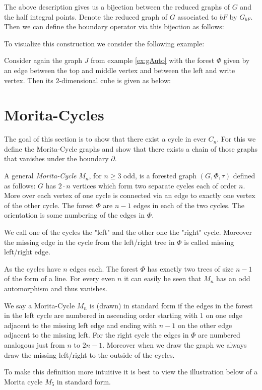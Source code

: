 The above description gives us a bijection between the reduced graphs of $G$ and the half integral points.
Denote the reduced graph of $G$ associated to $bF$ by $G_{bF}$. Then we can define the boundary operator via this bijection as follows:


To visualize this construction we consider the following example:
\begin{eg}
	Consider again the graph $J$ from example \ref{ex:gAuto} with the forest $\Phi$ given by an edge between the top and middle vertex and
	between the left and write vertex.
	Then its $2$-dimensional cube is given as below:
\end{eg}

\section{Morita-Cycles}
The goal of this section is to show that there exist a cycle in ever $C_{n}$.
For this we define the Morita-Cycle graphs and show that there exists a chain of those graphs that vanishes under the boundary $\partial$.

 \begin{definition}
	 A general \emph{Morita-Cycle} $M_{n}$, for $n \geq 3$ odd, is a forested graph $(G,\Phi,\tau)$ defined as follows:
	 $G$ has $2\cdot n$ vertices which form two separate cycles each of order $n$.
	 More over each vertex of one cycle is connected via an edge to exactly one vertex of the other cycle.
	 The forest $\Phi$ are $n-1$ edges in each of the two cycles.
	 The orientation is some numbering of the edges in $\Phi$. 

	 We call one of the cycles the "left" and the other one the "right" cycle.
	 Moreover the missing edge in the cycle from the left/right tree in $\Phi$ is called missing left/right edge.
\end{definition}
As the cycles have $n$ edges each. The forest $\Phi$ has exactly two trees of size $n-1$ of the form of a line.
For every even $n$ it can easily be seen that $M_{n}$ has an odd automorphism and thus vanishes.

\begin{definition}
	We say a Morita-Cycle $M_{n}$ is (drawn) in standard form if the edges in the forest in the left cycle are numbered in ascending order
	starting with $1$ on one edge adjacent to the missing left edge and ending with $n-1$ on the other edge adjacent to the missing left.
	For the right cycle the edges in $\Phi$ are numbered analogous just from $n$ to $2n-1$. 
	Moreover when we draw the graph we always draw the missing left/right to the outside of the cycles.

	To make this definition more intuitive it is best to view the illustration below of a Morita cycle $M_{5}$ in standard form.
\end{definition}

